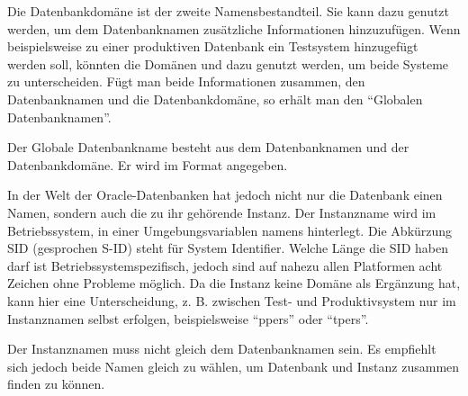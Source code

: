           Die Datenbankdom\"ane ist der zweite Namensbestandteil. Sie kann dazu genutzt werden, um dem Datenbanknamen zus\"atzliche Informationen hinzuzuf\"ugen. Wenn beispielsweise zu einer produktiven Datenbank ein Testsystem hinzugef\"ugt werden soll, k\"onnten die Dom\"anen  und  dazu genutzt werden, um beide Systeme zu unterscheiden. F\"ugt man beide Informationen zusammen, den Datenbanknamen und die Datenbankdom\"ane, so erh\"alt man den \enquote{Globalen Datenbanknamen}.
          \begin{merke}
            Der Globale Datenbankname besteht aus dem Datenbanknamen und der Datenbankdom\"ane. Er wird im Format  angegeben.
          \end{merke}
          In der Welt der Oracle-Datenbanken hat jedoch nicht nur die Datenbank einen Namen, sondern auch die zu ihr geh\"orende Instanz. Der Instanzname wird im Betriebssystem, in einer Umgebungsvariablen namens  hinterlegt. Die Abk\"urzung SID (gesprochen S-ID) steht f\"ur System Identifier. Welche L\"ange die SID haben darf ist Betriebssystemspezifisch, jedoch sind auf nahezu allen Platformen acht Zeichen ohne Probleme m\"oglich. Da die Instanz keine Dom\"ane als Erg\"anzung hat, kann hier eine Unterscheidung, z. B. zwischen Test- und Produktivsystem nur im Instanznamen selbst erfolgen, beispielsweise \enquote{ppers} oder \enquote{tpers}.
          \begin{merke}
            Der Instanznamen muss nicht gleich dem Datenbanknamen sein. Es empfiehlt sich jedoch beide Namen gleich zu w\"ahlen, um Datenbank und Instanz zusammen finden zu k\"onnen.
          \end{merke}
